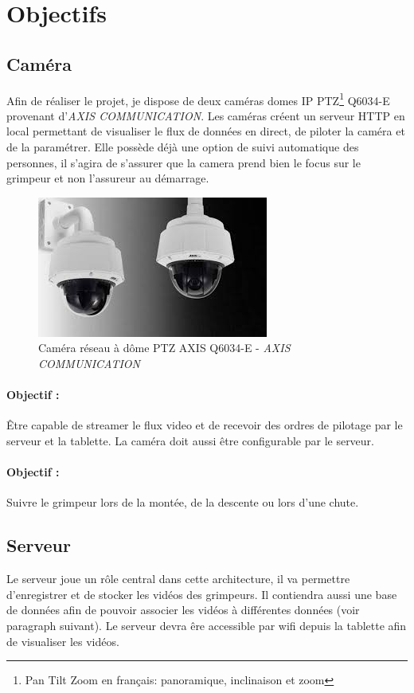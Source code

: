 \documentclass[a4paper, 11pt, french]{article}
\newcounter{obj}
\begin{document}
\section{Objectifs}
\subsection{Caméra}
Afin de réaliser le projet, je dispose de deux caméras domes IP PTZ\footnote{Pan Tilt Zoom en français: panoramique, inclinaison et zoom} Q6034-E provenant d'\textit{AXIS COMMUNICATION}. Les caméras créent un serveur HTTP en local permettant de visualiser le flux de données en direct, de piloter la caméra et de la paramétrer. Elle possède déjà une option de suivi automatique des personnes, il s'agira de s'assurer que la camera prend bien le focus sur le grimpeur et non l'assureur au démarrage. 

\begin{figure}
  \centering
  \includegraphics[]{cameraQ6304.jpg}
  \caption{Caméra réseau à dôme PTZ AXIS Q6034-E - \textit{AXIS COMMUNICATION}}
\end{figure}


\paragraph*{Objectif \theobj : } Être capable de streamer le flux video et de recevoir des ordres de pilotage par le serveur et la tablette. La caméra doit aussi être configurable par le serveur.

\paragraph*{Objectif \theobj : } Suivre le grimpeur lors de la montée, de la descente ou lors d'une chute.


\subsection{Serveur}
Le serveur joue un rôle central dans cette architecture, il va permettre d'enregistrer et de stocker les vidéos des grimpeurs. Il contiendra aussi une base de données afin de pouvoir associer les vidéos à différentes données (voir paragraph suivant). Le serveur devra êre accessible par wifi depuis la tablette afin de visualiser les vidéos.
\end{document}

